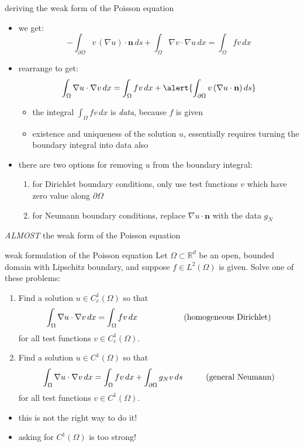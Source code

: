 \documentclass[10pt,
               svgnames,
               hyperref={colorlinks,
                         citecolor=DeepPink4,
                         linkcolor=FireBrick,
                         urlcolor=blue},
               usepdftitle=false]{beamer}
\newcommand{\bn}{\mathbf{n}}
\newcommand{\RR}{\mathbb{R}}
\newcommand{\grad}{\nabla}
\begin{document}
\begin{frame}{deriving the weak form of the Poisson equation}

\begin{itemize}
\item we get:
    $$-\int_{\partial\Omega} v\,(\grad u)\cdot \bn\,ds + \int_\Omega \grad v\cdot \grad u\,dx = \int_\Omega f v\,dx$$
\item rearrange to get:
    $$\int_\Omega \grad u \cdot \grad v\,dx = \int_\Omega f v\,dx + \alert{\int_{\partial\Omega} v\,(\grad u\cdot \bn)\,ds}$$

   \begin{itemize}
   \item[$\circ$] the integral $\int_\Omega f v\,dx$ is \emph{data}, because $f$ is given
   \item[$\circ$] existence and uniqueness of the solution $u$, essentially requires turning the \alert{boundary integral} into data also
   \end{itemize}
\item there are two options for removing $u$ from the boundary integral:

\begin{enumerate}
\item for Dirichlet boundary conditions, only use test functions $v$ which have zero value along $\partial \Omega$
\item for Neumann boundary conditions, replace $\grad u\cdot \bn$ with the data $g_N$
\end{enumerate}
\end{itemize}
\end{frame}


\begin{frame}{\emph{ALMOST} the weak form of the Poisson equation}

\begin{block}{weak formulation of the Poisson equation}
Let $\Omega\subset \RR^d$ be an open, bounded domain with Lipschitz boundary, and suppose $f\in L^2(\Omega)$ is given.  Solve one of these problems:
\begin{enumerate}
\item Find a solution $u\in C_c^1(\Omega)$ so that
    $$\int_\Omega \grad u \cdot \grad v\,dx = \int_\Omega f v\,dx \hspace{20mm} \text{(homogeneous Dirichlet)}$$
for all test functions $v\in C_c^1(\Omega)$.
\item Find a solution $u\in C^1(\Omega)$ so that
    $$\int_\Omega \grad u \cdot \grad v\,dx = \int_\Omega f v\,dx + \int_{\partial\Omega} g_N v\,ds \hspace{10mm} \text{(general Neumann)}$$
for all test functions $v\in C^1(\Omega)$.
\end{enumerate}
\end{block}

\begin{itemize}
\item \alert{this is not the right way to do it!}
\item asking for $C^1(\Omega)$ is too strong!
\end{itemize}
\end{frame}
\end{document}
